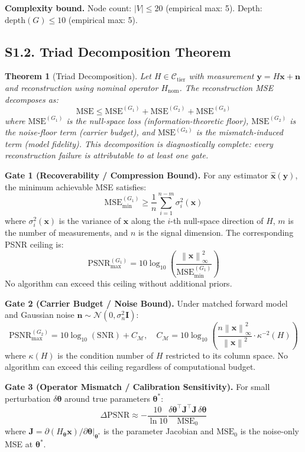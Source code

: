\documentclass[11pt,a4paper]{article}
\newtheorem{theorem}{Theorem}
\newcommand{\norm}[1]{\left\|#1\right\|}
\begin{document}
\textbf{Complexity bound.}
Node count: $|V| \leq 20$ (empirical max: 5).  Depth: $\mathrm{depth}(G) \leq 10$ (empirical max: 5).

\subsection{S1.2. Triad Decomposition Theorem}

\begin{theorem}[Triad Decomposition]
\label{thm:triad_supp}
Let $H \in \mathcal{C}_{\mathrm{tier}}$ with measurement $\mathbf{y} = H\mathbf{x} + \mathbf{n}$ and reconstruction using nominal operator $H_{\mathrm{nom}}$.  The reconstruction MSE decomposes as:
\[
\mathrm{MSE} \leq \mathrm{MSE}^{(G_1)} + \mathrm{MSE}^{(G_2)} + \mathrm{MSE}^{(G_3)}
\]
where $\mathrm{MSE}^{(G_1)}$ is the null-space loss (information-theoretic floor), $\mathrm{MSE}^{(G_2)}$ is the noise-floor term (carrier budget), and $\mathrm{MSE}^{(G_3)}$ is the mismatch-induced term (model fidelity).  This decomposition is diagnostically complete: every reconstruction failure is attributable to at least one gate.
\end{theorem}

\textbf{Gate 1 (Recoverability / Compression Bound).}
For any estimator $\hat{\mathbf{x}}(\mathbf{y})$, the minimum achievable MSE satisfies:
\[
\mathrm{MSE}_{\min}^{(G_1)} \geq \frac{1}{n}\sum_{i=1}^{n-m} \sigma_i^2(\mathbf{x})
\]
where $\sigma_i^2(\mathbf{x})$ is the variance of $\mathbf{x}$ along the $i$-th null-space direction of $H$, $m$ is the number of measurements, and $n$ is the signal dimension.  The corresponding PSNR ceiling is:
\[
\mathrm{PSNR}_{\max}^{(G_1)} = 10\log_{10}\!\left(\frac{\norm{\mathbf{x}}_\infty^2}{\mathrm{MSE}_{\min}^{(G_1)}}\right)
\]
No algorithm can exceed this ceiling without additional priors.

\textbf{Gate 2 (Carrier Budget / Noise Bound).}
Under matched forward model and Gaussian noise $\mathbf{n} \sim \mathcal{N}(0, \sigma_n^2 \mathbf{I})$:
\[
\mathrm{PSNR}_{\max}^{(G_2)} = 10\log_{10}(\mathrm{SNR}) + C_{\mathcal{M}}, \quad C_{\mathcal{M}} = 10\log_{10}\!\left(\frac{n\norm{\mathbf{x}}_\infty^2}{\norm{\mathbf{x}}^2} \cdot \kappa^{-2}(H)\right)
\]
where $\kappa(H)$ is the condition number of $H$ restricted to its column space.  No algorithm can exceed this ceiling regardless of computational budget.

\textbf{Gate 3 (Operator Mismatch / Calibration Sensitivity).}
For small perturbation $\delta\boldsymbol{\theta}$ around true parameters $\boldsymbol{\theta}^*$:
\[
\Delta\mathrm{PSNR} \approx -\frac{10}{\ln 10} \frac{\delta\boldsymbol{\theta}^\top \mathbf{J}^\top \mathbf{J}\, \delta\boldsymbol{\theta}}{\mathrm{MSE}_0}
\]
where $\mathbf{J} = \partial(H_{\boldsymbol{\theta}}\mathbf{x})/\partial\boldsymbol{\theta}\big|_{\boldsymbol{\theta}^*}$ is the parameter Jacobian and $\mathrm{MSE}_0$ is the noise-only MSE at $\boldsymbol{\theta}^*$.
\end{document}
